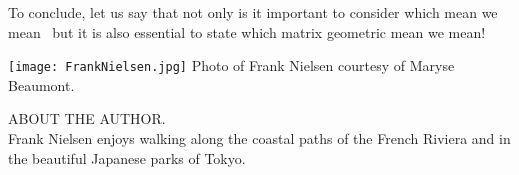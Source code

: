 \documentclass{article}
\begin{document}
To conclude, let us say that not only  is it important to consider which mean we mean~\cite{de2016mean} 
but it is also essential to state which matrix geometric mean we mean!

\vskip 1cm


\noindent\texttt{[image: FrankNielsen.jpg]}
Photo of Frank Nielsen courtesy of Maryse Beaumont.
\vskip 0.3cm

\noindent ABOUT THE AUTHOR.\\
\noindent Frank Nielsen enjoys walking along the coastal paths of the French Riviera and in the beautiful Japanese parks of Tokyo.




\end{document}
